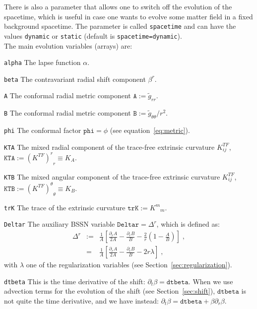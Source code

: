 \documentclass[12pt]{article}
\begin{document}
There is also a parameter that allows one to switch off the evolution
of the spacetime, which is useful in case one wants to evolve some
matter field in a fixed background spacetime. The parameter is called
\texttt{spacetime} and can have the values \texttt{dynamic} or
  \texttt{static} (default is \texttt{spacetime=dynamic}). \\

The main evolution variables (arrays) are:

\begin{list}{}{
\setlength{\leftmargin}{35mm}
\setlength{\labelsep}{10mm}
\setlength{\labelwidth}{20mm}}

\item[\texttt{alpha}] The lapse function $\alpha$.

\item[\texttt{beta}] The contravariant radial shift component $\beta^r$.

\item[\texttt{A}] The conformal radial metric component $\texttt{A}:=\tilde{g}_{rr}$.

\item[\texttt{B}] The conformal radial metric component $\texttt{B}:=\tilde{g}_{\theta \theta}/r^2$.

\item[\texttt{phi}] The conformal factor $\texttt{phi}=\phi$ (see equation~\ref{eq:metric}).

\item[\texttt{KTA}] The mixed radial component of the trace-free
  extrinsic curvature $K^{TF}_{ij}$, \mbox{$\texttt{KTA} :=
    {(K^{TF})^r}_r \equiv K_A$}.

\item[\texttt{KTB}] The mixed angular component of the trace-free
  extrinsic curvature $K^{TF}_{ij}$, \mbox{$\texttt{KTB} :=
    {(K^{TF})^\theta}_\theta \equiv K_B$}.

\item[\texttt{trK}] The trace of the extrinsic curvature \mbox{$\texttt{trK} :=
    {K^m}_m$}.

\item[\texttt{Deltar}] The auxiliary BSSN variable
  \mbox{$\texttt{Deltar} = \Delta^r$}, which is defined as:
\begin{eqnarray}
\Delta^r &:=& \frac{1}{A} \left[ \frac{\partial_r A}{2A} - \frac{\partial_r B}{B}
- \frac{2}{r} \left( 1 - \frac{A}{B} \right) \right] \; , \nonumber \\
&=& \frac{1}{A} \left[ \frac{\partial_r A}{2A} - \frac{\partial_r B}{B}
- 2 r \lambda \right] \; ,
\end{eqnarray}
with $\lambda$ one of the regularization variables (see
Section~\ref{sec:regularization}).

\item[\texttt{dtbeta}] This is the time derivative of the shift:
  $\partial_t \beta = \texttt{dtbeta}$.  When we use advection terms
  for the evolution of the shift (see Section~\ref{sec:shift}),
  $\texttt{dtbeta}$ is not quite the time derivative, and we have
  instead: \mbox{$\partial_t \beta = \texttt{dtbeta} + \beta
    \partial_r \beta$}.

\end{list}
\end{document}
